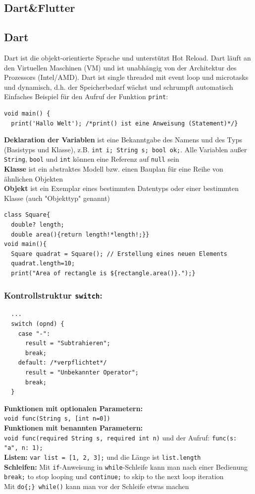 \documentclass[12pt,landscape]{article}
\def\code#1{\texttt{#1}} %
\begin{document}
\begin{multicols}{3}
\section{Dart\&Flutter}
\subsection{Dart}
Dart ist die objekt-orientierte Sprache und unterstützt Hot Reload. Dart läuft an den Virtuellen Maschinen (VM) und ist unabhängig von der Architektur des Prozessors (Intel/AMD). Dart ist single threaded mit event loop und microtasks und dynamisch, d.h. der Speicherbedarf wächst und schrumpft automatisch\\
Einfaches Beispiel für den Aufruf der Funktion \code{print}:
\begin{lstlisting}
void main() {
  print('Hallo Welt'); /*print() ist eine Anweisung (Statement)*/}
\end{lstlisting}
\textbf{Deklaration der Variablen} ist eine Bekanntgabe des Namens und des Typs (Basistyps und Klasse), z.B. \code{int i; String s; bool ok;}. Alle Variablen außer \code{String}, \code{bool} und \code{int} können eine Referenz auf \code{null} sein\\
\textbf{Klasse} ist ein abstraktes Modell bzw. einen Bauplan für eine Reihe von ähnlichen Objekten\\
\textbf{Objekt} ist ein Exemplar eines bestimmten Datentyps oder einer bestimmten Klasse (auch "Objekttyp" genannt)\\
\begin{lstlisting}
class Square{
  double? length;
  double area(){return length!*length!;}}
void main(){
  Square quadrat = Square(); // Erstellung eines neuen Elements 
  quadrat.length=10;
  print("Area of rectangle is ${rectangle.area()}.");}
\end{lstlisting}
\subsubsection{Kontrollstruktur \code{switch}:}
\begin{lstlisting}
  ...
  switch (opnd) {
    case "-":
      result = "Subtrahieren";
      break;
    default: /*verpflichtet*/
      result = "Unbekannter Operator";
      break;
  }
\end{lstlisting}
\textbf{Funktionen mit optionalen Parametern:}\\
\code{void func(String 
s, [int n=0])}\\
\textbf{Funktionen mit benannten Parametern:}\\
\code{void func({required String s, required int n})} und der Aufruf: \code{func(s: "a", n: 1);}\\
\textbf{Listen:} \code{var list = [1, 2, 3];} und die Länge ist \code{list.length}\\
\textbf{Schleifen:} Mit \code{if}-Anweisung in \code{while}-Schleife kann man nach einer Bedienung \code{break;} to stop looping und \code{continue;} to skip to the next loop iteration\\
Mit \code{do\{;\} while()} kann man vor der Schleife etwas machen

\end{multicols}
\end{document}
